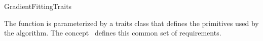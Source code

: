 

\begin{ccRefConcept}{GradientFittingTraits}


\ccDefinition
  
The function  is parameterized by a
traits class that defines the primitives used by the algorithm.   The
concept \ccRefName\ defines this common set of requirements.



\end{ccRefConcept}
